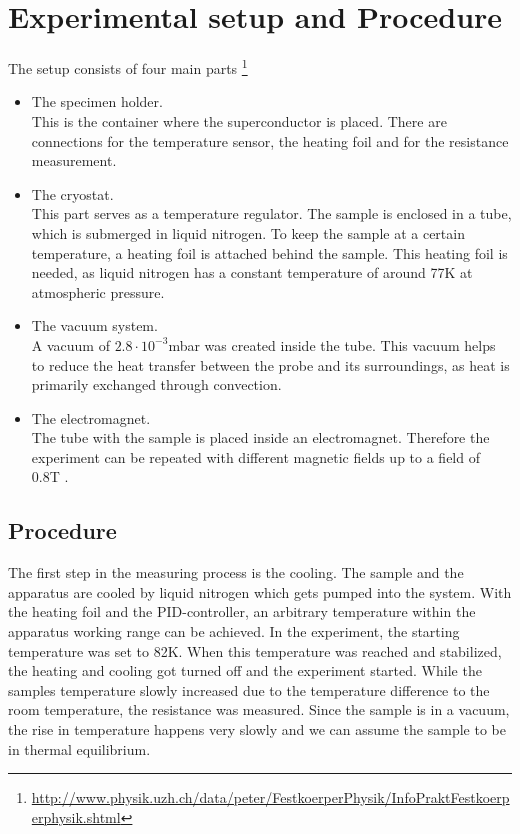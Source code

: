 \documentclass[a4paper,parskip,11pt, DIV12]{scrreprt}
\begin{document}
\chapter{Experimental setup and Procedure}

The setup consists of four main parts \footnote{\url{http://www.physik.uzh.ch/data/peter/FestkoerperPhysik/InfoPraktFestkoerperphysik.shtml}}\\
\begin{itemize}
\item The specimen holder.\\
This is the container where the superconductor is placed. There are connections for the temperature sensor, the heating foil and for the resistance measurement.\\
\item The cryostat.\\
This part serves as a temperature regulator. The sample is enclosed in a tube, which is submerged in liquid nitrogen. To keep the sample at a certain temperature, a heating foil is attached behind the sample. This heating foil is needed, as liquid nitrogen has a constant temperature of around 77K at atmospheric pressure. \\
\item The vacuum system.\\
A vacuum of $2.8 \cdot 10^{-3}$mbar was created inside the tube. This vacuum helps to reduce the heat transfer between the probe and its surroundings, as heat is primarily exchanged through convection.\\ 
\item The electromagnet.\\
The tube with the sample is placed inside an electromagnet. Therefore the experiment can be repeated with different magnetic fields up to a field of 0.8T . 

\end{itemize}
\clearpage

\section*{Procedure}

The first step in the measuring process is the cooling. The sample and the apparatus are cooled by liquid nitrogen which gets pumped into the system. With the heating foil and the PID-controller, an arbitrary temperature within the apparatus working range can be achieved. In the experiment, the starting temperature was set to 82K. When this temperature was reached and stabilized, the heating and cooling got turned off and the experiment started. While the samples temperature slowly increased due to the temperature difference to the room temperature, the resistance was measured. 
Since the sample is in a vacuum, the rise in temperature happens very slowly and we can assume the sample to be in thermal equilibrium. 
\end{document}
